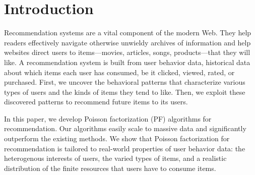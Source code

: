 \section{Introduction}

Recommendation systems are a vital component of the modern Web.  They
help readers effectively navigate otherwise unwieldy archives of
information and help websites direct users to items---movies,
articles, songs, products---that they will like.
A recommendation system is built from user behavior data, historical
data about which items each user has consumed, be it clicked, viewed,
rated, or purchased. First, we uncover the behavioral patterns that
characterize various types of users and the kinds of items they tend
to like.  Then, we exploit these discovered patterns to recommend
future items to its users.

In this paper, we develop Poisson factorization (PF) algorithms for
recommendation.  Our algorithms easily scale to massive data and
significantly outperform the existing methods.  We show that
Poisson factorization for recommendation is tailored to real-world
properties of user behavior data: the heterogenous interests of users,
the varied types of items, and a realistic distribution of the finite
resources that users have to consume items.



